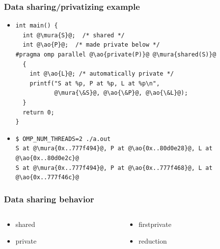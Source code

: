 \documentclass[12pt,dvipdfmx]{beamer}
\newcommand{\mura}[1]{{\color{purple}#1}}
\newcommand{\ao}[1]{{\color{blue}#1}}
\begin{document}
\begin{frame}[fragile]
\frametitle{Data sharing/privatizing example}
\begin{itemize}
\item []
\begin{lstlisting}
int main() {
  int @\mura{S}@;  /* shared */
  int @\ao{P}@;  /* made private below */
#pragma omp parallel @\ao{private(P)}@ @\mura{shared(S)}@
  {
    int @\ao{L}@; /* automatically private */
    printf("S at %p, P at %p, L at %p\n", 
           @\mura{\&S}@, @\ao{\&P}@, @\ao{\&L}@);
  }
  return 0;
}
\end{lstlisting}
\item []

{\small
\begin{lstlisting}
$ OMP_NUM_THREADS=2 ./a.out 
S at @\mura{0x..777f494}@, P at @\ao{0x..80d0e28}@, L at @\ao{0x..80d0e2c}@
S at @\mura{0x..777f494}@, P at @\ao{0x..777f468}@, L at @\ao{0x..777f46c}@
\end{lstlisting}}
\end{itemize}

\end{frame}

\begin{frame}[fragile]
\frametitle{Data sharing behavior}
\begin{columns}[t]
\begin{column}{0.5\textwidth}
  \begin{itemize}
  \item [] shared
  \end{itemize}
\begin{center}
\def\svgwidth{0.5\textwidth}
{\scriptsize }
\end{center}

  \begin{itemize}
  \item [] private
  \end{itemize}
\begin{center}
\def\svgwidth{0.5\textwidth}
{\scriptsize }
\end{center}
\end{column}

\begin{column}{0.5\textwidth}
\begin{itemize}
\item [] firstprivate
\end{itemize}
\begin{center}
\def\svgwidth{0.5\textwidth}
{\scriptsize }
\end{center}

\begin{itemize}
\item [] reduction
\end{itemize}
\begin{center}
\def\svgwidth{0.5\textwidth}
{\scriptsize }
\end{center}
\end{column}
\end{columns}
\end{frame}
\end{document}
